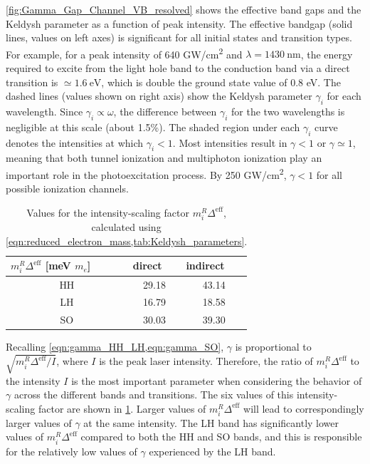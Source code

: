 \cref{fig:Gamma_Gap_Channel_VB_resolved} shows the effective band gaps and the Keldysh parameter as a function of peak intensity. The effective bandgap (solid lines, values on left axes) is significant for all initial states and transition types. For example, for a peak intensity of 640 GW/cm\textsuperscript{2} and $\lambda = 1430 \ \textrm{nm}$, the energy required to excite from the light hole band to the conduction band via a direct transition is $\simeq 1.6 \ \textrm{eV}$, which is double the ground state value of 0.8 eV. The dashed lines (values shown on right axis) show the Keldysh parameter $\gamma_i$ for each wavelength. Since $\gamma_i \propto \omega$, the difference between $\gamma_i$ for the two wavelengths is negligible at this scale (about 1.5\%). The shaded region under each $\gamma_i$ curve denotes the intensities at which $\gamma_i<1$. Most intensities result in $\gamma < 1$ or $\gamma \simeq 1$, meaning that both tunnel ionization and multiphoton ionization play an important role in the photoexcitation process. By 250 GW/cm\textsuperscript{2}, $\gamma < 1$ for all possible ionization channels.

\begin{table}[]
	\centering
	\begin{tabular}{c|c|c}
		\multicolumn{1}{l|}{$m_i^R \Delta^{\textrm{eff}}$ [meV $m_e$]} & \multicolumn{1}{l|}{direct} & \multicolumn{1}{l}{indirect} \\ \hline
		HH & 29.18 & 43.14 \\
		LH & 16.79 & 18.58 \\
		SO & 30.03 & 39.30
	\end{tabular}
	\caption{Values for the intensity-scaling factor $m_i^R \Delta^{\textrm{eff}}$, calculated using \cref{eqn:reduced_electron_mass,tab:Keldysh_parameters}.}
	\label{tab:gamma_factor}
\end{table}

Recalling \cref{eqn:gamma_HH_LH,eqn:gamma_SO}, $\gamma$ is proportional to $\sqrt{m_i^R \Delta^{\textrm{eff}} / I}$, where $I$ is the peak laser intensity. Therefore, the ratio of $m_i^R \Delta^{\textrm{eff}}$ to the intensity $I$ is the most important parameter when considering the behavior of $\gamma$ across the different bands and transitions. The six values of this intensity-scaling factor are shown in \cref{tab:gamma_factor}. Larger values of $m_i^R \Delta^{\textrm{eff}}$ will lead to correspondingly larger values of $\gamma$ at the same intensity. The LH band has significantly lower values of $m_i^R \Delta^{\textrm{eff}}$ compared to both the HH and SO bands, and this is responsible for the relatively low values of $\gamma$ experienced by the LH band.

